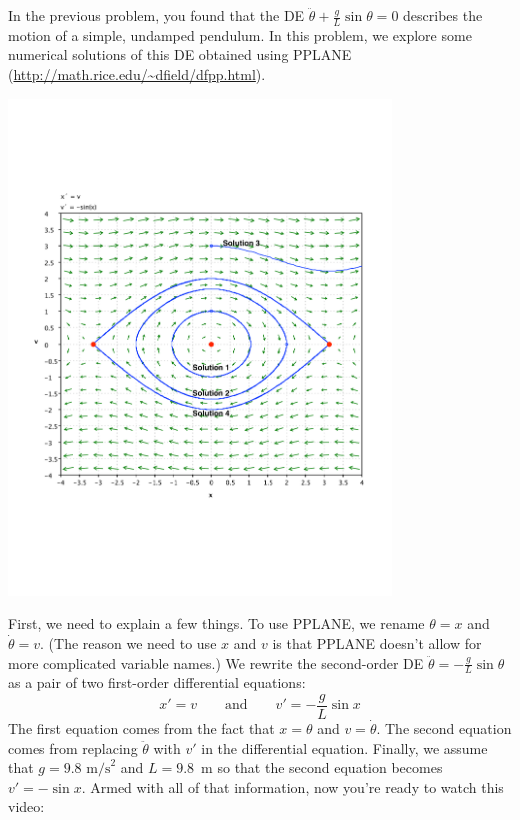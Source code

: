 \documentclass[12pt,letterpaper]{hmcpset}
\begin{document}
\begin{solution}
    \null\vfill
\end{solution}
\newpage

\begin{problem}[3]
    In the previous problem, you found that the DE $\ddot{\theta}+\frac{g}{L}\sin\theta=0$ describes the motion of a simple, undamped pendulum.  In this problem, we explore some numerical solutions of this DE obtained using PPLANE (\url{http://math.rice.edu/~dfield/dfpp.html}).  

    \begin{center}
        \includegraphics[width=4in,keepaspectratio=true]{img/apr_26_3_graph.pdf}
    \end{center}

    First, we need to explain a few things.  To use PPLANE, we rename $\theta=x$ and $\dot{\theta}=v$.  (The reason we need to use $x$ and $v$ is that PPLANE doesn't allow for more complicated variable names.)  We rewrite the second-order DE $\ddot{\theta}=-\frac{g}{L}\sin\theta$ as a pair of two first-order differential equations:
    \[
        x'=v \qquad \text{and} \qquad v'=-\frac{g}{L}\sin x
    \]
    The first equation comes from the fact that $x=\theta$ and $v=\dot{\theta}$.  The second equation comes from replacing $\ddot{\theta}$ with $v'$ in the differential equation.  Finally, we assume that $g=9.8\text{~m/s}^2$ and $L=9.8$~m so that the second equation becomes $v'=-\sin x$.  Armed with all of that information, now you're ready to watch this video:


\end{problem}
\end{document}
